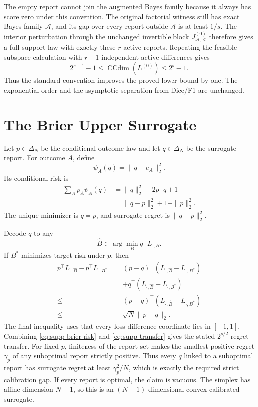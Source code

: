 \documentclass[twoside]{article}
\newcommand{\simplex}{\Delta}
\newcommand{\CCdim}{\operatorname{CCdim}}
\newcommand{\1}{\mathbf 1}
\begin{document}
The empty report cannot join the augmented Bayes family because it always has score zero under this convention. The original factorial witness still has exact Bayes family $\mathcal A$, and its gap over every report outside $\mathcal A$ is at least $1/s$. The interior perturbation through the unchanged invertible block $J^{(0)}_{\mathcal A,\mathcal A}$ therefore gives a full-support law with exactly these $r$ active reports. Repeating the feasible-subspace calculation with $r-1$ independent active differences gives
\begin{equation}
2^{s-1}-1\leq\CCdim(L^{(0)})\leq2^s-1.
\end{equation}
Thus the standard convention improves the proved lower bound by one. The exponential order and the asymptotic separation from Dice/F1 are unchanged.

\section{The Brier Upper Surrogate}

Let $p\in\simplex_N$ be the conditional outcome law and let $q\in\simplex_N$ be the surrogate report. For outcome $A$, define
\begin{equation}
\psi_A(q)=\|q-e_A\|_2^2.
\end{equation}
Its conditional risk is
\begin{align}
\sum_Ap_A\psi_A(q)
&=\|q\|_2^2-2p^\top q+1\\
&=\|q-p\|_2^2+1-\|p\|_2^2.
\label{eq:supp-brier-risk}
\end{align}
The unique minimizer is $q=p$, and surrogate regret is $\|q-p\|_2^2$.

Decode $q$ to any
\begin{equation}
\widehat B\in\arg\min_Bq^\top L_{\cdot,B}.
\end{equation}
If $B^*$ minimizes target risk under $p$, then
\begin{align}
p^\top L_{\cdot,\widehat B}-p^\top L_{\cdot,B^*}
={}&(p-q)^\top(L_{\cdot,\widehat B}-L_{\cdot,B^*})\\
&+q^\top(L_{\cdot,\widehat B}-L_{\cdot,B^*})\\
\leq{}&(p-q)^\top(L_{\cdot,\widehat B}-L_{\cdot,B^*})\\
\leq{}&\sqrt N\|p-q\|_2.
\label{eq:supp-transfer}
\end{align}
The final inequality uses that every loss difference coordinate lies in $[-1,1]$. Combining \eqref{eq:supp-brier-risk} and \eqref{eq:supp-transfer} gives the stated $2^{s/2}$ regret transfer. For fixed $p$, finiteness of the report set makes the smallest positive regret $\gamma_p$ of any suboptimal report strictly positive. Thus every $q$ linked to a suboptimal report has surrogate regret at least $\gamma_p^2/N$, which is exactly the required strict calibration gap. If every report is optimal, the claim is vacuous. The simplex has affine dimension $N-1$, so this is an $(N-1)$-dimensional convex calibrated surrogate.
\end{document}
